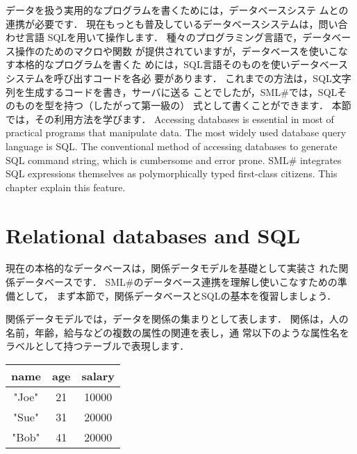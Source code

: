 \documentclass{jbook}
\newcommand{\txt}[2]{#2}
\newcommand{\smlsharp}{SML\#}
\begin{document}
\ifx\jp%
	データを扱う実用的なプログラムを書くためには，データベースシステ
ムとの連携が必要です．
	現在もっとも普及しているデータベースシステムは，問い合わせ言語
SQLを用いて操作します．
	種々のプログラミング言語で，データベース操作のためのマクロや関数
が提供されていますが，データベースを使いこなす本格的なプログラムを書くた
めには，SQL言語そのものを使いデータベースシステムを呼び出すコードを各必
要があります． 
	これまでの方法は，SQL文字列を生成するコードを書き，サーバに送る
ことでしたが，\smlsharp{}では，SQLそのものを型を持つ（したがって第一級の）
式として書くことができます．
	本節では，その利用方法を学びます．
\else%
	Accessing databases is essential in most of practical programs
that manipulate data.
	The most widely used database query language is SQL.
	The conventional method of accessing databases to generate SQL
command string, which is cumbersome and error prone.
	\smlsharp{} integrates SQL expressions themselves as
polymorphically typed first-class citizens.
	This chapter explain this feature.
\fi%
	
\section{\txt{関係データベースとSQL}{Relational databases and SQL}}
\label{sec:tutorialRelationalModel}

\ifx\jp%
	現在の本格的なデータベースは，関係データモデルを基礎として実装さ
れた関係データベースです．
	\smlsharp{}のデータベース連携を理解し使いこなすための準備として，
まず本節で，関係データベースとSQLの基本を復習しましょう．

	関係データモデルでは，データを関係の集まりとして表します．
	関係は，人の名前，年齢，給与などの複数の属性の関連を表し，通
常以下のような属性名をラベルとして持つテーブルで表現します．

\begin{center}
\begin{tabular}{|c|c|c|}
\hline
name & age & salary
\\\hline
"Joe" & 21 & 10000
\\\hline
"Sue" & 31 & 20000
\\\hline
"Bob" & 41 & 20000
\\\hline
\end{tabular}
\end{center}
\end{document}

